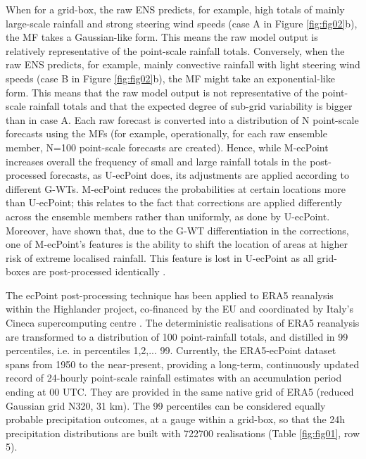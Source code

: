 \documentclass{ametsocV6.1}
\begin{document}
When for a grid-box, the raw ENS predicts, for example, high totals of mainly large-scale rainfall and strong steering wind speeds (case A in Figure \ref{fig:fig02}b), the MF takes a Gaussian-like form. This means the raw model output is relatively representative of the point-scale rainfall totals. Conversely, when the raw ENS predicts, for example, mainly convective rainfall with light steering wind speeds (case B in Figure \ref{fig:fig02}b), the MF might take an exponential-like form. This means that the raw model output is not representative of the point-scale rainfall totals and that the expected degree of sub-grid variability is bigger than in case A. Each raw forecast is converted into a distribution of N point-scale forecasts using the MFs (for example, operationally, for each raw ensemble member, N=100 point-scale forecasts are created). Hence, while M-ecPoint increases overall the frequency of small and large rainfall totals in the post-processed forecasts, as U-ecPoint does, its adjustments are applied according to different G-WTs. M-ecPoint reduces the probabilities at certain locations more than U-ecPoint; this relates to the fact that corrections are applied differently across the ensemble members rather than uniformly, as done by U-ecPoint. Moreover, \citet{HewsonPillosu2021} have shown that, due to the G-WT differentiation in the corrections, one of M-ecPoint's features is the ability to shift the location of areas at higher risk of extreme localised rainfall. This feature is lost in U-ecPoint as all grid-boxes are post-processed identically \citep{Pillosu2025}.

The ecPoint post-processing technique has been applied to ERA5 reanalysis within the Highlander project, co‑financed by the EU and coordinated by Italy's Cineca supercomputing centre \citep {Bottazzi2024}. The deterministic realisations of ERA5 reanalysis are transformed to a distribution of 100 point-rainfall totals, and distilled in 99 percentiles, i.e. in percentiles 1,2,... 99. Currently, the ERA5-ecPoint dataset spans from 1950 to the near-present, providing a long-term, continuously updated record of 24-hourly point-scale rainfall estimates with an accumulation period ending at 00 UTC. They are provided in the same native grid of ERA5 (reduced Gaussian grid N320, 31 km). The 99 percentiles can be considered equally probable precipitation outcomes, at a gauge within a grid-box, so that the 24h precipitation distributions are built with 722700 realisations (Table \ref{fig:fig01}, row 5).


\end{document}
